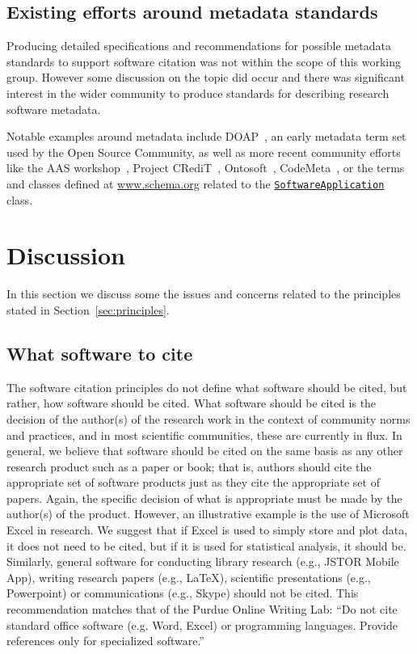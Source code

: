 \documentclass[11pt, oneside]{amsart}
\begin{document}
\subsection{Existing efforts around metadata standards}

Producing detailed specifications and recommendations for possible metadata
standards to support software citation was not within the scope of this working
group. However some discussion on the topic did occur and there was significant
interest in the wider community to produce standards for describing research
software metadata.

Notable examples around metadata include DOAP~\cite{DOAP}, an early metadata
term set used by the Open Source Community, as well as more recent community
efforts like the AAS workshop~\cite{aas-software-index}, Project
CRediT~\cite{casrai-credit}, Ontosoft~\cite{ontosoft}, CodeMeta~\cite{codemeta},
or the terms and classes defined at \href{https://schema.org}{www.schema.org} related to the
\href{https://schema.org/SoftwareApplication}{\texttt{SoftwareApplication}} class.

\section{Discussion}
\label{sec:discussion}

In this section we discuss some the issues and concerns related to the principles stated in Section~\ref{sec:principles}.

\subsection{What software to cite}

The software citation principles do not define what software should be cited, but rather, how software should be cited.
What software should be cited is the decision of the author(s) of the research work in the context of community norms and practices, and in most scientific communities, these are currently in flux.
In general, we believe that software should be cited on the same basis as any other research product such as a paper or book; that is, authors should cite the appropriate set of software products just as they cite the appropriate set of papers.
Again, the specific decision of what is appropriate must be made by the author(s) of the product.
However, an illustrative example is the use of Microsoft Excel in research.
We suggest that if Excel is used to simply store and plot data, it does not need to be cited, but if it is used for statistical analysis, it should be.  Similarly, general software for conducting library research (e.g., JSTOR Mobile App), writing research papers (e.g., \LaTeX), scientific presentations (e.g., Powerpoint) or communications (e.g., Skype) should not be cited.
This recommendation matches that of the Purdue Online Writing Lab: ``Do not cite standard office software (e.g. Word, Excel) or programming languages.  Provide references only for specialized software.''~\cite{powl-citing-software}
\end{document}
